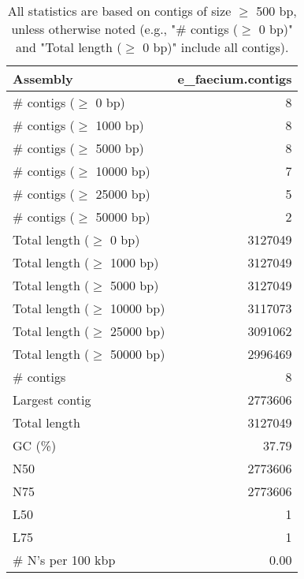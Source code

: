 \documentclass[12pt,a4paper]{article}
\begin{document}
\begin{table}[ht]
\begin{center}
\caption{All statistics are based on contigs of size $\geq$ 500 bp, unless otherwise noted (e.g., "\# contigs ($\geq$ 0 bp)" and "Total length ($\geq$ 0 bp)" include all contigs).}
\begin{tabular}{|l*{1}{|r}|}
\hline
Assembly & e\_faecium.contigs \\ \hline
\# contigs ($\geq$ 0 bp) & 8 \\ \hline
\# contigs ($\geq$ 1000 bp) & 8 \\ \hline
\# contigs ($\geq$ 5000 bp) & 8 \\ \hline
\# contigs ($\geq$ 10000 bp) & 7 \\ \hline
\# contigs ($\geq$ 25000 bp) & 5 \\ \hline
\# contigs ($\geq$ 50000 bp) & 2 \\ \hline
Total length ($\geq$ 0 bp) & 3127049 \\ \hline
Total length ($\geq$ 1000 bp) & 3127049 \\ \hline
Total length ($\geq$ 5000 bp) & 3127049 \\ \hline
Total length ($\geq$ 10000 bp) & 3117073 \\ \hline
Total length ($\geq$ 25000 bp) & 3091062 \\ \hline
Total length ($\geq$ 50000 bp) & 2996469 \\ \hline
\# contigs & 8 \\ \hline
Largest contig & 2773606 \\ \hline
Total length & 3127049 \\ \hline
GC (\%) & 37.79 \\ \hline
N50 & 2773606 \\ \hline
N75 & 2773606 \\ \hline
L50 & 1 \\ \hline
L75 & 1 \\ \hline
\# N's per 100 kbp & 0.00 \\ \hline
\end{tabular}
\end{center}
\end{table}
\end{document}
